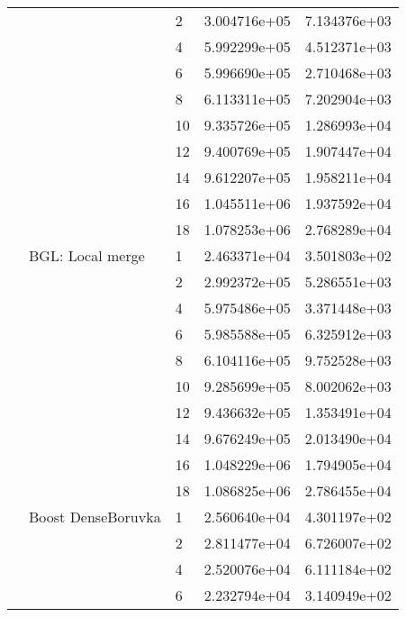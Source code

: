 \begin{tabular}{lllrr}
                      &            & 2  &  3.004716e+05 &  7.134376e+03 \\
                      &            & 4  &  5.992299e+05 &  4.512371e+03 \\
                      &            & 6  &  5.996690e+05 &  2.710468e+03 \\
                      &            & 8  &  6.113311e+05 &  7.202904e+03 \\
                      &            & 10 &  9.335726e+05 &  1.286993e+04 \\
                      &            & 12 &  9.400769e+05 &  1.907447e+04 \\
                      &            & 14 &  9.612207e+05 &  1.958211e+04 \\
                      &            & 16 &  1.045511e+06 &  1.937592e+04 \\
                      &            & 18 &  1.078253e+06 &  2.768289e+04 \\
                      & BGL: Local merge & 1  &  2.463371e+04 &  3.501803e+02 \\
                      &            & 2  &  2.992372e+05 &  5.286551e+03 \\
                      &            & 4  &  5.975486e+05 &  3.371448e+03 \\
                      &            & 6  &  5.985588e+05 &  6.325912e+03 \\
                      &            & 8  &  6.104116e+05 &  9.752528e+03 \\
                      &            & 10 &  9.285699e+05 &  8.002062e+03 \\
                      &            & 12 &  9.436632e+05 &  1.353491e+04 \\
                      &            & 14 &  9.676249e+05 &  2.013490e+04 \\
                      &            & 16 &  1.048229e+06 &  1.794905e+04 \\
                      &            & 18 &  1.086825e+06 &  2.786455e+04 \\
                      & Boost DenseBoruvka & 1  &  2.560640e+04 &  4.301197e+02 \\
                      &            & 2  &  2.811477e+04 &  6.726007e+02 \\
                      &            & 4  &  2.520076e+04 &  6.111184e+02 \\
                      &            & 6  &  2.232794e+04 &  3.140949e+02 \\

\end{tabular}
